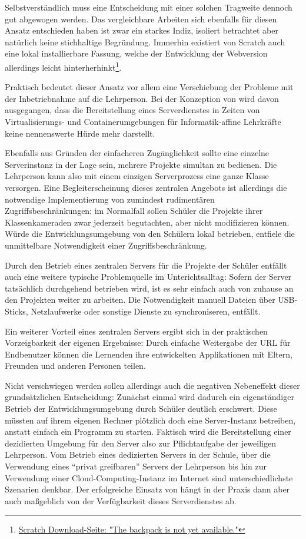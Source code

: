Selbstverständlich muss eine Entscheidung mit einer solchen Tragweite dennoch gut abgewogen werden. Das vergleichbare Arbeiten sich ebenfalls für diesen Ansatz entschieden haben ist zwar ein starkes Indiz, isoliert betrachtet aber natürlich keine stichhaltige Begründung. Immerhin existiert von Scratch auch eine lokal installierbare Fassung, welche der Entwicklung der Webversion allerdings leicht hinterherhinkt\footnote{\href{https://scratch.mit.edu/scratch2download/}{Scratch Download-Seite: "The backpack is not yet available."}}.

Praktisch bedeutet dieser Ansatz vor allem eine Verschiebung der Probleme mit der Inbetriebnahme auf die Lehrperson. Bei der Konzeption von \idename wird davon ausgegangen, dass die Bereitstellung eines Serverdienstes in Zeiten von Virtualisierungs- und Containerumgebungen für Informatik-affine Lehrkräfte keine nennenswerte Hürde mehr darstellt.

Ebenfalls aus Gründen der einfacheren Zugänglichkeit sollte eine einzelne Serverinstanz in der Lage sein, mehrere Projekte simultan zu bedienen. Die Lehrperson kann also mit einem einzigen Serverprozess eine ganze Klasse versorgen. Eine Begleiterscheinung dieses zentralen Angebots ist allerdings die notwendige Implementierung von zumindest rudimentären Zugriffsbeschränkungen: im Normalfall sollen Schüler die Projekte ihrer Klassenkameraden zwar jederzeit begutachten, aber nicht modifizieren können. Würde die Entwicklungsumgebung von den Schülern lokal betrieben, entfiele die unmittelbare Notwendigkeit einer Zugriffsbeschränkung.

Durch den Betrieb eines zentralen Servers für die Projekte der Schüler entfällt auch eine weitere typische Problemquelle im Unterichtsalltag: Sofern der Server tatsächlich durchgehend betrieben wird, ist es sehr einfach auch von zuhause an den Projekten weiter zu arbeiten. Die Notwendigkeit manuell Dateien über USB-Sticks, Netzlaufwerke oder sonstige Dienste zu synchroniseren, entfällt.

Ein weiterer Vorteil eines zentralen Servers ergibt sich in der praktischen Vorzeigbarkeit der eigenen Ergebnisse: Durch einfache Weitergabe der URL für Endbenutzer können die Lernenden ihre entwickelten Applikationen mit Eltern, Freunden und anderen Personen teilen.

Nicht verschwiegen werden sollen allerdings auch die negativen Nebeneffekt dieser grundsätzlichen Entscheidung: Zunächst einmal wird dadurch ein eigenständiger Betrieb der Entwicklungsumgebung durch Schüler deutlich erschwert. Diese müssten auf ihrem eigenen Rechner plötzlich doch eine Server-Instanz betreiben, anstatt einfach ein Programm zu starten. Faktisch wird die Bereitstellung einer dezidierten Umgebung für den Server also zur Pflichtaufgabe der jeweiligen Lehrperson. Vom Betrieb eines dedizierten Servers in der Schule, über die Verwendung eines ``privat greifbaren'' Servers der Lehrperson bis hin zur Verwendung einer Cloud-Computing-Instanz im Internet sind unterschiedlichste Szenarien denkbar. Der erfolgreiche Einsatz von \idename hängt in der Praxis dann aber auch maßgeblich von der Verfügbarkeit dieses Serverdienstes ab.

